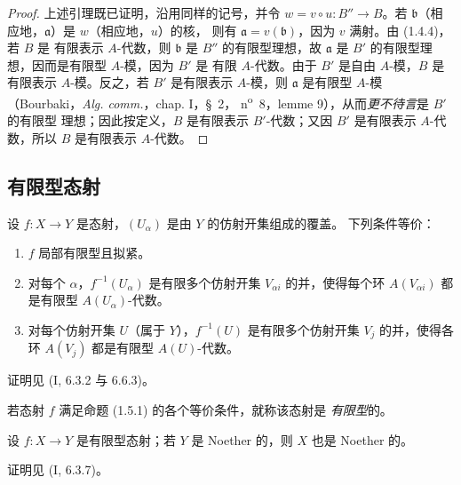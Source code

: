 \begin{proof}
上述引理既已证明，沿用同样的记号，并令 $w=v\circ u:B''\to B$。若
$\mathfrak b$（相应地，$\mathfrak a$）是 $w$（相应地，$u$）的核，
则有 $\mathfrak a=v(\mathfrak b)$，因为 $v$ 满射。由 (1.4.4)，若 $B$ 是
有限表示 $A$-代数，则 $\mathfrak b$ 是 $B''$ 的有限型理想，故
$\mathfrak a$ 是 $B'$ 的有限型理想，因而是有限型 $A$-模，因为 $B'$ 是
有限 $A$-代数。由于 $B'$ 是自由 $A$-模，$B$ 是有限表示
$A$-模。反之，若 $B'$ 是有限表示 $A$-模，则 $\mathfrak a$ 是有限型
$A$-模（Bourbaki，\emph{Alg. comm.}，chap. I，\S~2，
n\textsuperscript{o}~8，lemme 9），从而\emph{更不待言}是 $B'$ 的有限型
理想；因此按定义，$B$ 是有限表示 $B'$-代数；又因 $B'$ 是有限表示
$A$-代数，所以 $B$ 是有限表示 $A$-代数。
\end{proof}

\subsection{有限型态射}
\label{subsection:IV.1.5-fr}

\begin{proposition}[1.5.1]
\label{IV.1.5.1-fr}
设 $f:X\to Y$ 是态射，$(U_\alpha)$ 是由 $Y$ 的仿射开集组成的覆盖。
下列条件等价：
\begin{enumerate}
  \item[a)] $f$ 局部有限型且拟紧。
  \item[b)] 对每个 $\alpha$，$f^{-1}(U_\alpha)$ 是有限多个仿射开集
  $V_{\alpha i}$ 的并，使得每个环 $A(V_{\alpha i})$ 都是有限型
  $A(U_\alpha)$-代数。
  \item[c)] 对每个仿射开集 $U$（属于 $Y$），$f^{-1}(U)$ 是有限多个仿射开集
  $V_j$ 的并，使得各环 $A(V_j)$ 都是有限型 $A(U)$-代数。
\end{enumerate}
\end{proposition}

证明见 (I, 6.3.2 与 6.6.3)。

\begin{definition}[1.5.2]
\label{IV.1.5.2-fr}
若态射 $f$ 满足命题 (1.5.1) 的各个等价条件，就称该态射是
\emph{有限型}的。
\end{definition}


\begin{proposition}[1.5.3]
\label{IV.1.5.3-fr}
设 $f:X\to Y$ 是有限型态射；若 $Y$ 是 Noether 的，则 $X$ 也是
Noether 的。
\end{proposition}

证明见 (I, 6.3.7)。

